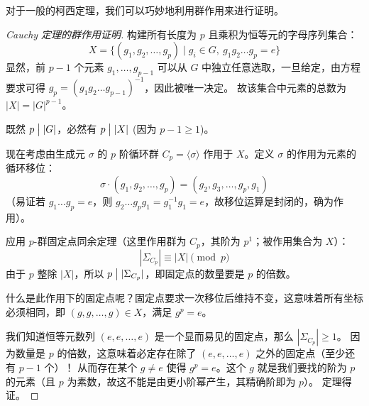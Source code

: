 \documentclass[11pt]{article}
\begin{document}
对于一般的柯西定理，我们可以巧妙地利用群作用来进行证明。

\begin{proof}[Cauchy 定理的群作用证明]
    构建所有长度为 $p$ 且乘积为恒等元的字母序列集合：
    \[
    X = \{ (g_1, g_2, \dots, g_p) \mid g_i \in G, ~ g_1 g_2 \dots g_p = e \}
    \]
    显然，前 $p-1$ 个元素 $g_1, \dots, g_{p-1}$ 可以从 $G$ 中独立任意选取，一旦给定，由方程要求可得 $g_p = (g_1 g_2 \dots g_{p-1})^{-1}$，因此被唯一决定。
    故该集合中元素的总数为 $|X| = |G|^{p-1}$。
    
    既然 $p \bigm| |G|$，必然有 $p \bigm| |X|$ (因为 $p - 1 \ge 1$)。
    
    现在考虑由生成元 $\sigma$ 的 $p$ 阶循环群 $C_p = \langle \sigma \rangle$ 作用于 $X$。定义 $\sigma$ 的作用为元素的循环移位：
    \[
    \sigma \cdot (g_1, g_2, \dots, g_p) = (g_2, g_3, \dots, g_p, g_1)
    \]
    （易证若 $g_1 \dots g_p = e$，则 $g_2 \dots g_p g_1 = g_1^{-1} g_1 = e$，故移位运算是封闭的，确为作用）。
    
    应用 $p$-群固定点同余定理（这里作用群为 $C_p$，其阶为 $p^1$；被作用集合为 $X$）：
    \[
    |\Sigma_{C_p}| \equiv |X| \pmod p
    \]
    由于 $p$ 整除 $|X|$，所以 $p \bigm| |\Sigma_{C_p}|$，即固定点的数量要是 $p$ 的倍数。
    
    什么是此作用下的固定点呢？固定点要求一次移位后维持不变，这意味着所有坐标必须相同，即 $(g, g, \dots, g) \in X$，满足 $g^p = e$。
    
    我们知道恒等元数列 $(e, e, \dots, e)$ 是一个显而易见的固定点，那么 $|\Sigma_{C_p}| \ge 1$。
    因为数量是 $p$ 的倍数，这意味着必定存在除了 $(e, e, \dots, e)$ 之外的固定点（至少还有 $p-1$ 个）！
    从而存在某个 $g \neq e$ 使得 $g^p = e$。这个 $g$ 就是我们要找的阶为 $p$ 的元素（且 $p$ 为素数，故这不能是由更小阶幂产生，其精确阶即为 $p$）。
    定理得证。
\end{proof}
\end{document}

